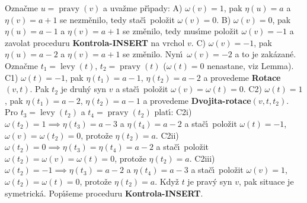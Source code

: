 \documentclass[a4paper,12pt]{article}
\DeclareMathOperator*{\levy}{levy}
\DeclareMathOperator*{\pravy}{pravy}
\begin{document}
\flushpar Ozna\v cme $u=\pravy(v)$ a uva\v zme p\v r\'\i pady:\newline 
A) $\omega (v)=1$, pak $\eta (u)=a$ a $\eta (v)=a+1$ se nezm\v enilo, 
tedy sta\v c\'\i\ polo\v zit $\omega (v)=0$.\newline 
B) $\omega (v)=0$, pak $\eta (u)=a-1$ a $\eta (v)=a+1$ se zm\v enilo, 
tedy mus\'\i me polo\v zit $\omega (v)=-1$ a zavolat proceduru 
{\bf Kontrola-INSERT} na vrchol $v$.\newline 
C) $\omega (v)=-1$, pak $\eta (u)=a-2$ a $\eta (v)=a+1$ se zm\v enilo. 
Nyn\'\i\ $\omega (v)=-2$ a to je zak\'azan\'e. Ozna\v cme $t_1=\levy
(t)$, 
$t_2=\pravy(t)$ ($\omega (t)=0$ nenastane, viz Lemma). 
\newline 
C1) $\omega (t)=-1$, pak $\eta (t_1)=a-1$, $\eta (t_2)=a-2$ a provedeme 
{\bf Rotace$(v,t)$}. Pak $t_2$ je druh\'y syn $v$ a sta\v c\'\i\ polo\v zit 
$\omega (v)=\omega (t)=0$.\newline 
C2) $\omega (t)=1$, pak $\eta (t_1)=a-2$, $\eta (t_2)=a-1$ a provedeme 
{\bf Dvojita-rotace$(v,t,t_2)$}. Pro $t_3=\levy(t_2)$ a $t_4=\pravy
(t_2)$ 
plat\'\i :\newline 
C2i) $\omega (t_2)=1\implies\eta (t_3)=a-3$ a $\eta (t_4)=a-2$ a sta\v c\'\i\ 
polo\v zit $\omega (t)=-1$, $\omega (v)=\omega (t_2)=0$, proto\v ze $
\eta (t_2)=a$.\newline 
C2ii) $\omega (t_2)=0\implies\eta (t_3)=\eta (t_4)=a-2$ a sta\v c\'\i\ polo\v zit 
$\omega (t_2)=\omega (v)=\omega (t)=0$, proto\v ze $\eta (t_2)=a$. \newline 
C2iii) $\omega (t_2)=-1\implies\eta (t_3)=a-2$ a $\eta (t_4)=a-3$ a 
sta\v c\'\i\ polo\v zit $\omega (v)=1$, $\omega (t_2)=\omega (t)=
0$, proto\v ze $\eta (t_2)=a$.\newline 
Kdy\v z $t$ je prav\'y syn $v$, pak situace je symetrick\'a.\newline 
Pop\'\i\v seme proceduru {\bf Kontrola-INSERT}.
\medskip
\end{document}
